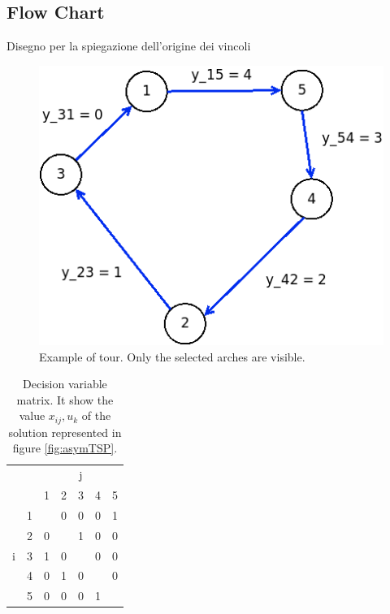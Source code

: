 \subsection{Flow Chart}
Disegno per la spiegazione dell'origine dei vincoli


\begin{figure}[h]
	\centering
	\includegraphics[width=.2\columnwidth]{img/asymTSP_FC_example.png}
	\caption{Example of tour. Only the selected arches are visible.}
	\label{fig:asymTSP_FC}
\end{figure}

\begin{table}[h!]
	\begin{center}
		\caption{Decision variable matrix. It show the value $ x_{ij}, u_k $ of the solution represented in figure \ref{fig:asymTSP}. }
		\label{tab:asymTSP_FC_solution}
		\begin{tabular}{cc|c|c|c|c|c|}
			\multicolumn{2}{c}{} & \multicolumn{5}{c}{j} \\ %
			& \multicolumn{1}{c}{} & \multicolumn{1}{c}{1} & \multicolumn{1}{c}{2} & \multicolumn{1}{c}{3} & \multicolumn{1}{c}{4} & \multicolumn{1}{c}{5} \\ \cline{3-7}
			\multirow{5}{*}{i} 	& 1 & \cellcolor{Black} & 0 & 0 & 0 & 1 \\ \cline{3-7}
			& 2 & 0 & \cellcolor{Black} & 1 & 0 & 0 \\ \cline{3-7}
			& 3 & 1 & 0 & \cellcolor{Black} & 0 & 0 \\ \cline{3-7}
			& 4 & 0 & 1 & 0 & \cellcolor{Black} & 0 \\ \cline{3-7}
			& 5 & 0 & 0 & 0 & 1 & \cellcolor{Black} \\ \cline{3-7}
		\end{tabular}
	\end{center}
\end{table}

